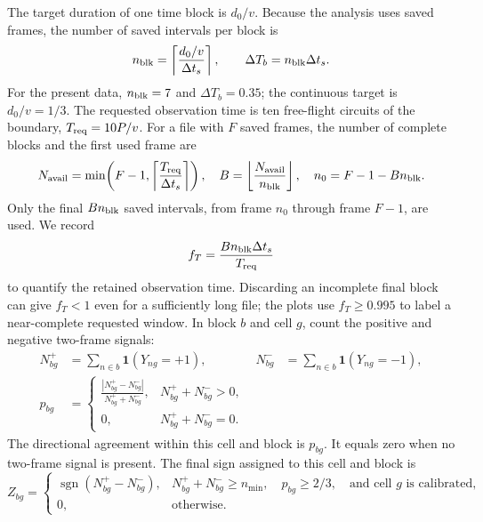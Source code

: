 \documentclass[11pt]{article}
\numberwithin{equation}{section}
\begin{document}
The target duration of one time block is $d_0/v$.  Because the analysis uses
saved frames, the number of saved intervals per block is
\begin{equation}
  n_{\rm blk}=\left\lceil\frac{d_0/v}{\Delta t_s}\right\rceil,
  \qquad
  \Delta T_b=n_{\rm blk}\Delta t_s.
  \label{eq:boundary_block_time}
\end{equation}
For the present data, $n_{\rm blk}=7$ and $\Delta T_b=0.35$; the continuous
target is $d_0/v=1/3$.  The requested observation time is ten free-flight
circuits of the boundary, $T_{\rm req}=10P/v$.  For a file with $F$ saved
frames, the number of complete blocks and the first used frame are
\begin{equation}
 N_{\rm avail}=\min\!\left(F-1,
 \left\lceil\frac{T_{\rm req}}{\Delta t_s}\right\rceil\right),
 \quad
 B=\left\lfloor\frac{N_{\rm avail}}{n_{\rm blk}}\right\rfloor,
 \quad
 n_0=F-1-Bn_{\rm blk}.
 \label{eq:terminal_window_blocks}
\end{equation}
Only the final $Bn_{\rm blk}$ saved intervals, from frame $n_0$ through frame
$F-1$, are used.  We record
\begin{equation}
 f_T=\frac{Bn_{\rm blk}\Delta t_s}{T_{\rm req}}
 \label{eq:analysis_window_fraction}
\end{equation}
to quantify the retained observation time. Discarding an incomplete final
block can give $f_T<1$ even for a sufficiently long file; the plots use
$f_T\ge0.995$ to label a near-complete requested window.
In block $b$ and cell $g$, count the positive and negative
two-frame signals:
\begin{align}
  N_{bg}^{+}&=\sum_{n\in b}\mathbf 1(Y_{ng}=+1),
  &
  N_{bg}^{-}&=\sum_{n\in b}\mathbf 1(Y_{ng}=-1),
  \label{eq:block_sign_counts}\\
  p_{bg}&=
  \begin{cases}
  \displaystyle
  \frac{|N_{bg}^{+}-N_{bg}^{-}|}{N_{bg}^{+}+N_{bg}^{-}},
  &N_{bg}^{+}+N_{bg}^{-}>0,\\[0.6em]
  0,&N_{bg}^{+}+N_{bg}^{-}=0.
  \end{cases}
  \label{eq:block_conditional_purity}
\end{align}
The directional agreement within this cell and block is $p_{bg}$.  It equals
zero when no two-frame signal is present.  The final sign assigned to this cell
and block is
\begin{equation}
  Z_{bg}=\begin{cases}
  \operatorname{sgn}(N_{bg}^{+}-N_{bg}^{-}),
  &N_{bg}^{+}+N_{bg}^{-}\ge n_{\min},\quad
   p_{bg}\ge2/3,\quad \text{and cell $g$ is calibrated},\\
  0,&\text{otherwise}.
  \end{cases}
  \label{eq:block_gate_sign}
\end{equation}
\end{document}
